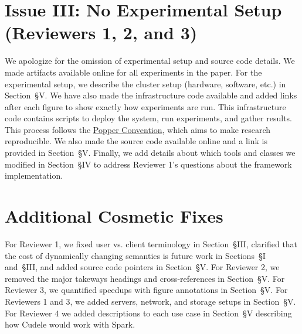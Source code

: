 \documentclass[onecolumn,conference]{IEEEtran}
\begin{document}
\section*{Issue III: No Experimental Setup (Reviewers 1, 2, and 3)}

We apologize for the omission of experimental setup and source code details.
We made artifacts available online for all experiments in the paper. For the
experimental setup, we describe the cluster setup (hardware, software, etc.) in
Section~{\S}V.  We have also made the infrastructure code available and added
links after each figure to show exactly how experiments are run.  This
infrastructure code contains scripts to deploy the system, run experiments, and
gather results.  This process follows the \href{http://falsifiable.us/}{Popper
Convention}, which aims to make research reproducible.  We also made the source
code available online and a link is provided in Section~{\S}V. Finally, we add
details about which tools and classes we modified in Section~{\S}IV to address
Reviewer 1's questions about the framework implementation.

\section*{Additional Cosmetic Fixes}

For Reviewer 1, we fixed user vs. client terminology in Section~{\S}III,
clarified that the cost of dynamically changing semantics is future work in
Sections~{\S}I and~{\S}III, and added source code pointers in Section~{\S}V.
For Reviewer 2, we removed the major takeways headings and cross-references in
Section~{\S}V. For Reviewer 3, we quantified speedups with figure annotations
in Section~{\S}V. For Reviewers 1 and 3, we added servers, network, and storage
setups in Section~{\S}V. For Reviewer 4 we added descriptions to each use case
in Section~{\S}V describing how Cudele would work with Spark. 
\end{document}
